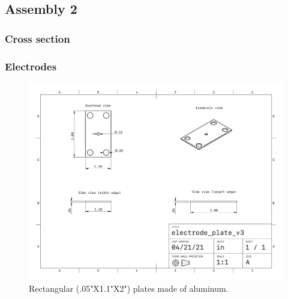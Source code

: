 \newpage

\subsection{Assembly 2}
\subsubsection{Cross section}

\subsubsection{Electrodes}

\begin{figure}[H]
  \centering
  \includegraphics[width=.776\textwidth]{figs/ALGAAS/assemblies/assembly2/assembly2_electrode.pdf}
  \caption{Rectangular (.05"X1.1"X2") plates made of aluminum.}
\end{figure}

\newpage
